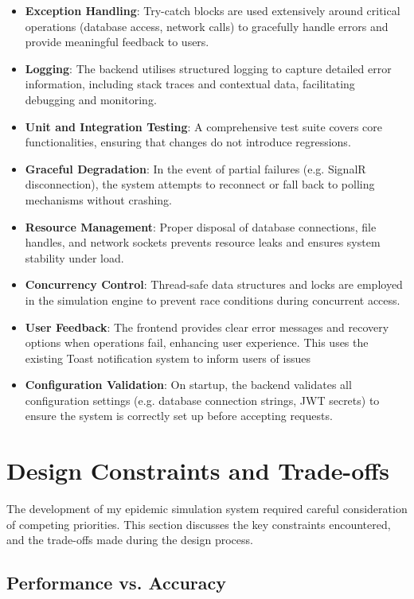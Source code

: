 \begin{itemize}
    \item \textbf{Exception Handling}: Try-catch blocks are used extensively around critical operations (database access, network calls) to gracefully handle errors and provide meaningful feedback to users.
    \item \textbf{Logging}: The backend utilises structured logging  to capture detailed error information, including stack traces and contextual data, facilitating debugging and monitoring.
    \item \textbf{Unit and Integration Testing}: A comprehensive test suite covers core functionalities, ensuring that changes do not introduce regressions.
    \item \textbf{Graceful Degradation}: In the event of partial failures (e.g. SignalR disconnection), the system attempts to reconnect or fall back to polling mechanisms without crashing.
    \item \textbf{Resource Management}: Proper disposal of database connections, file handles, and network sockets prevents resource leaks and ensures system stability under load.
    \item \textbf{Concurrency Control}: Thread-safe data structures and locks are employed in the simulation engine to prevent race conditions during concurrent access.
    \item \textbf{User Feedback}: The frontend provides clear error messages and recovery options when operations fail, enhancing user experience. This uses the existing Toast notification system to inform users of issues
    \item \textbf{Configuration Validation}: On startup, the backend validates all configuration settings (e.g. database connection strings, JWT secrets) to ensure the system is correctly set up before accepting requests.
\end{itemize}


\section{Design Constraints and Trade-offs}

The development of my epidemic simulation system required careful consideration of competing priorities. This section discusses the key constraints encountered, and the trade-offs made during the design process.

\subsection{Performance vs. Accuracy}


